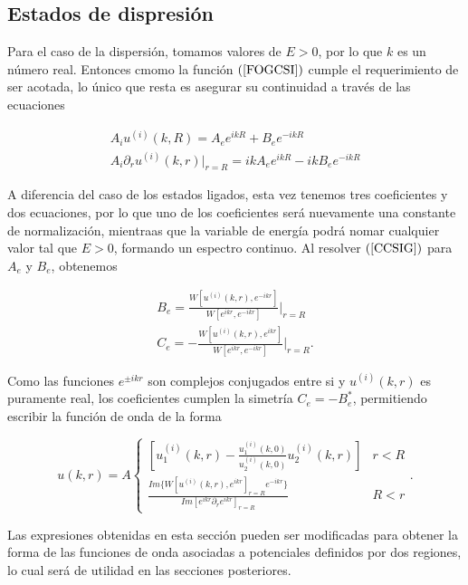 \subsection{Estados de dispresión}

Para el caso de la dispersión, tomamos valores de $E > 0$, por lo que $k$ es un número real. Entonces cmomo la función $(\ref{FOGCSI})$ cumple el requerimiento de ser acotada, lo único que resta es asegurar su continuidad a través de las ecuaciones 

\begin{eqnarray*}
\label{CCSIG}
A_i u^{(i)}(k,R)  = A_e e^{i k R} + B_e e^{-i k R} 
\\ 
A_i \partial_r u^{(i)}(k,r)|_{r = R}  = i k A_e e^{i k R} - i k B_e e^{-i k R} 
\end{eqnarray*}


A diferencia del caso de los estados ligados, esta vez tenemos tres coeficientes y dos ecuaciones, por lo que uno de los coeficientes será nuevamente una constante de normalización, mientraas que la variable de energía podrá nomar cualquier valor tal que $E > 0$, formando un espectro continuo. Al resolver $(\ref{CCSIG})$ para $A_e $ y $B_e$, obtenemos

\begin{eqnarray*}
	B_e = \frac{W[u^{(i)}(k,r), e^{-i k r}]}{W[e^{ikr},e^{-ikr}]}  \Bigr\rvert_{r=R}
	\\
	C_e = -\frac{W[u^{(i)}(k,r), e^{i k r}]}{W[e^{ikr},e^{-ikr}]}  \Bigr\rvert_{r=R}.
\end{eqnarray*}


Como las funciones $e^{\pm ikr}$ son complejos conjugados entre si y $u^{(i)}(k,r)$ es puramente real, los coeficientes cumplen la simetría $C_e = - B^{*}_e$, permitiendo escribir la función de onda de la forma

\begin{equation}
u(k,r) =
A 
\begin{cases}
\left[ u^{(i)}_1(k,r) -  \frac{u^{(i)}_1(k,0)}{u_2^{(i)}(k,0)} u_2^{(i)}(k,r) \right] & r < R 
\\ 
 \frac{Im \{W[u^{(i)}(k,r), e^{i k r}]_{r=R} e^{-i k r}\}}{Im[e^{ikr} \partial_r e^{ikr}]_{r=R}} & R < r
\end{cases}.
\end{equation}

Las expresiones obtenidas en esta sección pueden ser modificadas para obtener la forma de las funciones de onda asociadas a potenciales definidos por dos regiones, lo cual será de utilidad en las secciones posteriores.